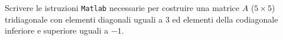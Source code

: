 Scrivere le istruzioni {\tt Matlab} necessarie per costruire 
 una matrice $A$ ($5\times 5$) tridiagonale con elementi diagonali
uguali a $3$ ed elementi della codiagonale inferiore e superiore uguali a  $-1$.